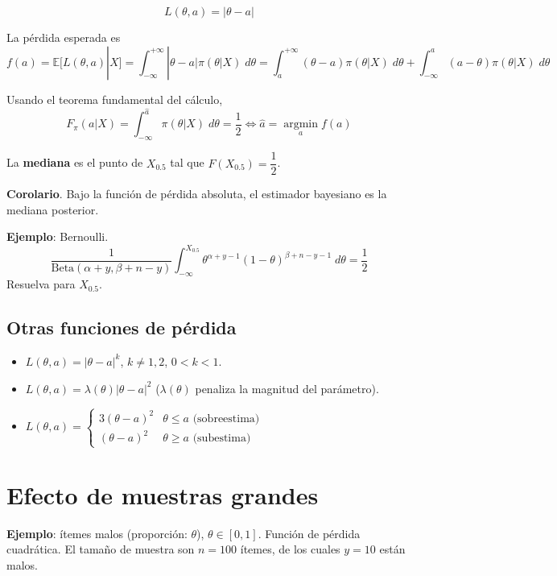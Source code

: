 \documentclass[
  12pt,
]{book}
\begin{document}
\[ L(\theta,a) = |\theta-a|\]

La pérdida esperada es
\[ f(a) = \mathbb{E}[L(\theta,a)|X] = \int_{-\infty}^{+\infty}|\theta-a|\pi(\theta|X)\;d\theta = \int_{a}^{+\infty}(\theta-a)\pi(\theta|X)\;d\theta + \int_{-\infty}^{a}(a-\theta)\pi(\theta|X)\;d\theta \]

Usando el teorema fundamental del cálculo,
\[F_{\pi}(a|X) = \int_{-\infty}^{\hat a}\pi(\theta|X)\;d\theta = \dfrac12 \Leftrightarrow \hat a= \operatorname*{argmin}_a f(a)\]

La \textbf{mediana} es el punto de \(X_{0.5}\) tal que \(F(X_{0.5}) = \dfrac{1}{2}\).

\textbf{Corolario}. Bajo la función de pérdida absoluta, el estimador bayesiano es la mediana posterior.

\textbf{Ejemplo}: Bernoulli.
\[ \dfrac{1}{\text{Beta}(\alpha+y, \beta+n-y)}\int_{-\infty}^{X_{0.5}}\theta^{\alpha+y-1} (1-\theta)^{\beta+n-y-1}\;d\theta = \dfrac12\]
Resuelva para \(X_{0.5}\).

\hypertarget{otras-funciones-de-puxe9rdida}{%
\subsection{Otras funciones de pérdida}\label{otras-funciones-de-puxe9rdida}}

\begin{itemize}
\item
  \(L(\theta,a) = |\theta-a|^k\), \(k\ne 1,2\), \(0<k<1\).
\item
  \(L(\theta,a) = \lambda(\theta)|\theta-a|^2\) (\(\lambda(\theta)\) penaliza la magnitud del parámetro).
\item
  \(L(\theta,a)=\begin{cases}3(\theta-a)^2 & \theta\leq a \text{ (sobreestima)}\\ (\theta-a)^2&\theta\geq a \text{ (subestima)} \end{cases}\)
\end{itemize}

\hypertarget{efecto-de-muestras-grandes}{%
\section{Efecto de muestras grandes}\label{efecto-de-muestras-grandes}}

\textbf{Ejemplo}: ítemes malos (proporción: \(\theta\)), \(\theta \in [0,1]\). Función de pérdida cuadrática. El tamaño de muestra son \(n=100\) ítemes, de los cuales \(y=10\) están malos.
\end{document}

